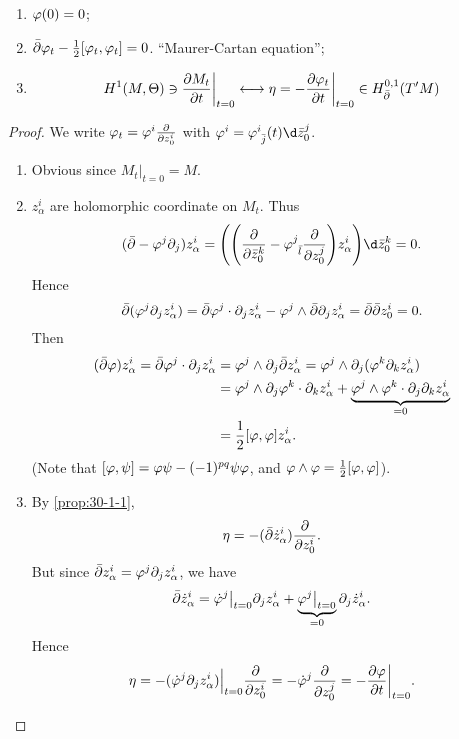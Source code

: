 \documentclass[12pt]{article}
\begin{document}
\begin{theorem}\hfill
  \begin{enumerate}[(1)]
  \item \(\varphi(0)=0\);
  \item \(\bar{\partial}\varphi_t-\frac{1}{2}[\varphi_t,\varphi_t]=0\). ``Maurer-Cartan
    equation'';
  \item \[
      H^1(M,\Theta)\ni\pdv{M_t}{t}\bigg|_{t=0}\longleftrightarrow
      \eta=-\pdv{\varphi_t}{t}\bigg|_{t=0}\in H^{0,1}_{\bar{\partial}}(T'M)
    \]
  \end{enumerate}
\end{theorem}
\begin{proof}
  We write \(\varphi_t=\varphi^i\pdv{}{z^i_0}\) with \(\vphi^i=\vphi\indices{^i_{\bar{j}}}(t)
  \dd{\bar{z}^j_0}\).
  \begin{enumerate}[(1)]
  \item Obvious since \(M_t\big|_{t=0}=M\).
  \item \(z^i_\alpha\) are holomorphic coordinate on \(M_t\). Thus \[
      (\bar{\partial}-\vphi^j\partial_j)z^i_\alpha=\left(\left(\pd{\bar{z}^k_0}
      -\vphi\indices{^j_{\bar{l}}}\pd{z^j_0}\right)z^i_\alpha\right)\dd{\bar{z}^k_0}=0
    .\] Hence \[
      \bar{\partial}(\varphi^j\partial_j z^i_\alpha)=\bar{\partial}\varphi^j\cdot
      \partial_j z^i_\alpha-\varphi^j\wedge\bar{\partial}\partial_j z^i_\alpha
      =\bar{\partial}\bar{\partial}z^i_0=0
    .\] Then
    \begin{align*}
      (\bar{\partial}\varphi)z^i_\alpha=\bar{\partial}\varphi^j\cdot \partial_j z^i_\alpha
      &=\varphi^j\wedge\partial_j \bar{\partial}z^i_\alpha=\varphi^j\wedge\partial_j
      (\varphi^k\partial_k z^i_\alpha) \\
      &=\varphi^j\wedge\partial_j\varphi^k\cdot \partial_k z^i_\alpha+\underbrace{
      \varphi^j\wedge\varphi^k\cdot \partial_j\partial_k z^i_\alpha}_{=0} \\
      &=\frac{1}{2}[\varphi,\varphi]z^i_\alpha
    .\end{align*} 
    (Note that \([\varphi,\psi]=\varphi\psi-(-1)^{pq}\psi\varphi\), and \(\varphi\wedge\varphi
    =\frac{1}{2}[\varphi,\varphi]\)).
  \item By \cref{prop:30-1-1}, \[
      \eta=-(\bar{\partial}\dot{z}^i_\alpha)\pdv{}{z^i_0}
    .\] But since \(\bar{\partial}z^i_\alpha=\varphi^j\partial_j z^i_\alpha\), we have \[
      \bar{\partial}\dot{z}^i_\alpha=\dot{\varphi}^j\big|_{t=0}\partial_j z_\alpha^i
      +\underbrace{\varphi^j\big|_{t=0}}_{=0}\partial_j \dot{z}^i_\alpha
    .\] Hence \[
      \eta=-(\dot{\varphi}^j\partial_j z^i_\alpha)\Big|_{t=0}\pdv{}{z^i_0}
      =-\dot{\varphi}^j\pdv{}{z^j_0}=-\pdv{\varphi}{t}\bigg|_{t=0}
    .\] 
  \end{enumerate}
\end{proof}
\end{document}
